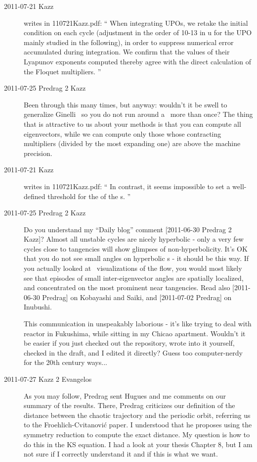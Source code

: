 \begin{description}
\item[2011-07-21 Kazz] writes in 110721Kazz.pdf:
``
When integrating UPOs, we retake the initial condition on each cycle
(adjustment in the order of 10-13 in u for the UPO mainly studied in the
following), in order to suppress numerical error accumulated during
integration. We confirm that the values of their Lyapunov exponents
computed thereby agree with the direct calculation of the Floquet
multipliers.
''

\item[2011-07-25 Predrag 2 Kazz]
Been through this many times, but anyway: wouldn't it be swell to
generalize Ginelli \etal\ so you do not run around a \po\ more than once?
The thing that is attractive to us about your methods is that you can
compute all eigenvectors, while we can compute only those whose
contracting multipliers (divided by the most expanding one) are above the
machine precision.

\item[2011-07-21 Kazz] writes in 110721Kazz.pdf:
``
In contrast, it seems impossible to set a well-defined threshold for the
{\cLvs} of the \po s.
''

\item[2011-07-25 Predrag 2 Kazz]
Do you understand my ``Daily blog'' comment  [2011-06-30 Predrag 2 Kazz]?
Almost all unstable cycles are nicely hyperbolic - only a very few cycles
close to tangencies will show glimpses of non-hyperbolicity. It's OK that
you do not see small angles on hyperbolic \po s - it should be this way.
If you actually looked at \statesp\ visualizations of the
flow, you would most likely see that
episodes of small inter-eigenvector angles are spatially localized, and
concentrated on the most prominent near tangencies. Read also [2011-06-30
Predrag] on Kobayashi and Saiki, and [2011-07-02 Predrag] on Inubushi.

This communication in unspeakably laborious - it's like trying to deal
with reactor in Fukushima, while sitting in my Chicao apartment. Wouldn't
it be easier if you just checked out the repository, wrote into it
yourself, checked in the draft, and I edited it directly? Guess too
computer-nerdy for the 20th century ways...

\item[2011-07-27 Kazz 2 Evangelos] As you may follow, Predrag sent Hugues
and me comments on our summary of the results. There, Predrag criticizes
our definition of the distance between the chaotic trajectory and the
periodic orbit, referring us to the Froehlich-Cvitanovi\'c paper. I
understood that he proposes using the symmetry reduction to compute the
exact distance. My question is how to do this in the KS equation. I had a
look at your thesis Chapter 8, but I am not sure if I correctly
understand it and if this is what we want.


\end{description}

